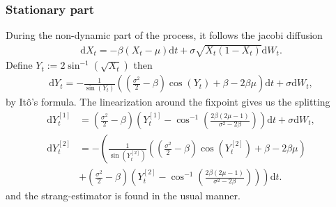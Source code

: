 \subsubsection{Stationary part}
During the non-dynamic part of the process, it follows the jacobi diffusion
\begin{align}
    \mathrm{d}X_t = -\beta\left(X_t - \mu\right)\mathrm{d}t + \sigma \sqrt{X_t\left(1 - X_t\right)}\mathrm{d}W_t.
\end{align}
Define $Y_t := 2 \sin^{-1}\left(\sqrt{X_t}\right)$ then 
\begin{align}
    \mathrm{d}Y_t = -\frac{1}{\sin\left(Y_t\right)}\left(\left(\frac{\sigma^2}{2}-\beta\right)\cos(Y_t) + \beta - 2\beta\mu\right)\mathrm{d}t + \sigma \mathrm{d}W_t,
\end{align}
by Itô's formula. The linearization around the fixpoint gives us the splitting
\begin{align}
    \mathrm{d}Y_t^{[1]} &= \left(\frac{\sigma^2}{2} - \beta\right)\left(Y_t^{[1]} - \cos^{-1}\left(\frac{2\beta\left(2\mu - 1\right)}{\sigma^2 - 2\beta}\right)\right)\mathrm{d}t + \sigma \mathrm{d}W_t,\\
    \mathrm{d}Y_t^{[2]} &= -\left(\frac{1}{\sin\left(Y_t^{[2]}\right)}\left(\left(\frac{\sigma^2}{2}-\beta\right)\cos(Y_t^{[2]}) + \beta - 2\beta\mu\right) \right. \nonumber \\
    &+ \left. \left(\frac{\sigma^2}{2} - \beta\right)\left(Y_t^{[2]} - \cos^{-1}\left(\frac{2\beta\left(2\mu - 1\right)}{\sigma^2 - 2\beta}\right)\right) \right)\mathrm{d}t .
\end{align}
and the strang-estimator is found in the usual manner.
